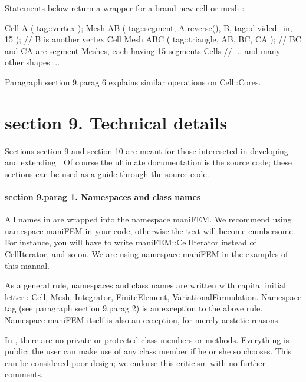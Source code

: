 {Statements below return a wrapper for a brand new cell or mesh :

\verbatim
   Cell A ( tag::vertex );
   Mesh AB ( tag::segment, A.reverse(), B, tag::divided_in, 15 );
   // B is another vertex Cell
   Mesh ABC ( tag::triangle, AB, BC, CA );
   //  BC and CA are segment Meshes, each having 15 segments Cells
   // ... and many other shapes ...
\endverbatim

Paragraph \numb section 9.\numb parag 6 explains similar operations on {\codett Cell::Core}s.





\section{\numb section 9. Technical details}

Sections \numb section 9 and \numb section 10 are meant for those intereseted in developing and
extending \maniFEM.
Of course the ultimate documentation is the source code; these sections can be used as
a guide through the source code.


\paragraph{\numb section 9.\numb parag 1. Namespaces and class names}

All names in {\maniFEM} are wrapped into the namespace {\codett maniFEM}.
We recommend {\codett using namespace maniFEM} in your code,
otherwise the text will become cumbersome.
For instance, you will have to write {\codett maniFEM::CellIterator} instead of
{\codett CellIterator}, and so on.
We are {\codett using namespace maniFEM} in the examples of this manual.

As a general rule, namespaces and class names are written with capital initial
letter$\;$:
{\codett Cell}, {\codett Mesh}, {\codett Integrator}, {\codett FiniteElement},
{\codett VariationalFormulation}.
Namespace {\codett tag} (see paragraph \numb section 9.\numb parag 2) is an exception
to the above rule.
Namespace {\codett maniFEM} itself is also an exception, for merely aestetic reasons.

In \maniFEM, there are no {\codett private} or {\codett protected} class members or methods.
Everything is {\codett public};
the user can make use of any class member if he or she so chooses.
This can be considered poor design; we endorse this criticism with no further comments.

}
